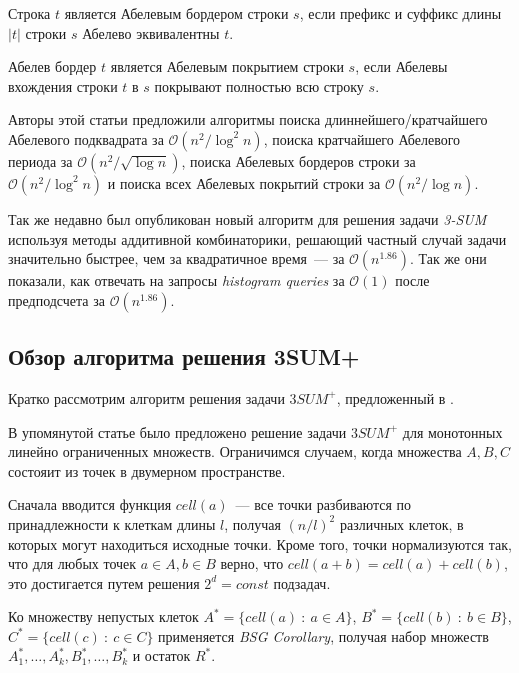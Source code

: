 \begin{definition}
Строка $t$ является Абелевым бордером строки $s$, если префикс и суффикс длины $|t|$ строки $s$ Абелево эквивалентны $t$.
\end{definition}

\begin{definition}
Абелев бордер $t$ является Абелевым покрытием строки $s$, если Абелевы вхождения строки $t$ в $s$ покрывают полностью всю строку $s$.
\end{definition}

Авторы этой статьи предложили алгоритмы поиска длиннейшего/кратчайшего Абелевого подквадрата за $\mathcal{O}(n^2 / \log^2 n)$, поиска кратчайшего Абелевого периода за $\mathcal{O}(n^2 / \sqrt{\log n})$, поиска Абелевых бордеров строки за $\mathcal{O}(n^2 / \log^2 n)$ и поиска всех Абелевых покрытий строки за $\mathcal{O}(n^2 / \log n)$.

Так же недавно был опубликован новый алгоритм для решения задачи \textit{3-SUM} используя методы аддитивной комбинаторики, решающий частный случай задачи значительно быстрее, чем за квадратичное время~--- за $\mathcal{O}(n^{1.86})$. Так же они показали, как отвечать на запросы \textit{histogram queries} за $\mathcal{O}(1)$ после предподсчета за $\mathcal{O}(n^{1.86})$.

\subsection{Обзор алгоритма решения 3SUM+}

Кратко рассмотрим алгоритм решения задачи $3SUM^+$, предложенный в \cite{2}. 

В упомянутой статье было предложено решение задачи $3SUM^+$ для монотонных линейно ограниченных множеств. Ограничимся случаем, когда множества $A, B, C$ состояит из точек в двумерном пространстве.

Сначала вводится функция $cell(a)$~--- все точки разбиваются по принадлежности к клеткам длины $l$, получая $(n/l)^2$ различных клеток, в которых могут находиться исходные точки. Кроме того, точки нормализуются так, что для любых точек $a \in A, b \in B$ верно, что $cell(a+b)=cell(a)+cell(b)$, это достигается путем решения $2^d=const$ подзадач.

Ко множеству непустых клеток $A^* = \{cell(a)\ :\ a \in A\}$,  $B^* = \{cell(b)\ :\ b \in B\}$, $C^* = \{cell(c)\ :\ c \in C\}$ применяется \textit{BSG Corollary}, получая набор множеств $A_1^*, \ldots, A_k^*, B_1^*, \ldots, B_k^*$ и остаток $R^*$.

